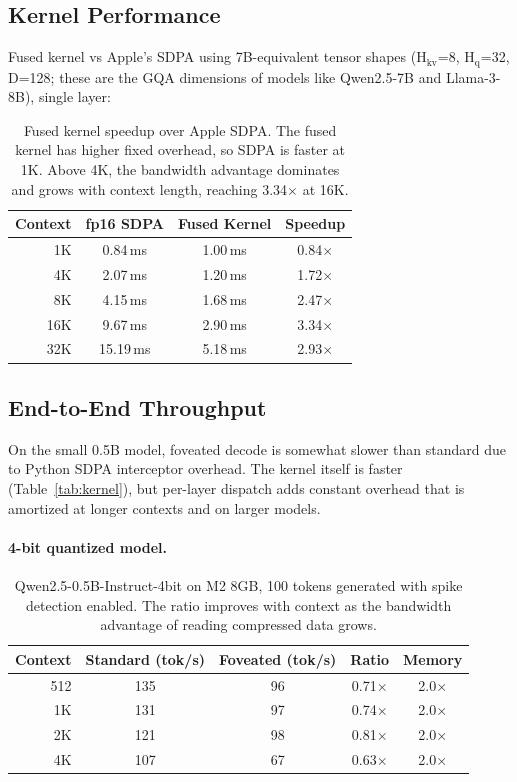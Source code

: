 \documentclass{article}
\begin{document}
\subsection{Kernel Performance}

Fused kernel vs Apple's SDPA using 7B-equivalent tensor shapes
(H$_\text{kv}$=8, H$_\text{q}$=32, D=128; these are the GQA
dimensions of models like Qwen2.5-7B and Llama-3-8B), single layer:

\begin{table}[h]
\centering
\begin{tabular}{rccc}
\toprule
Context & fp16 SDPA & Fused Kernel & Speedup \\
\midrule
1K & 0.84\,ms & 1.00\,ms & 0.84$\times$ \\
4K & 2.07\,ms & 1.20\,ms & 1.72$\times$ \\
8K & 4.15\,ms & 1.68\,ms & 2.47$\times$ \\
16K & 9.67\,ms & 2.90\,ms & 3.34$\times$ \\
32K & 15.19\,ms & 5.18\,ms & 2.93$\times$ \\
\bottomrule
\end{tabular}
\caption{Fused kernel speedup over Apple SDPA. The fused kernel has
higher fixed overhead, so SDPA is faster at 1K. Above 4K, the
bandwidth advantage dominates and grows with context length, reaching
3.34$\times$ at 16K.}
\end{table}

\subsection{End-to-End Throughput}

On the small 0.5B model, foveated decode is somewhat slower than standard
due to Python SDPA interceptor overhead. The kernel itself is faster
(Table~\ref{tab:kernel}), but per-layer dispatch adds constant overhead
that is amortized at longer contexts and on larger models.

\paragraph{4-bit quantized model.}

\begin{table}[h]
\centering
\begin{tabular}{rcccc}
\toprule
Context & Standard (tok/s) & Foveated (tok/s) & Ratio & Memory \\
\midrule
512 & 135 & 96 & 0.71$\times$ & 2.0$\times$ \\
1K & 131 & 97 & 0.74$\times$ & 2.0$\times$ \\
2K & 121 & 98 & 0.81$\times$ & 2.0$\times$ \\
4K & 107 & 67 & 0.63$\times$ & 2.0$\times$ \\
\bottomrule
\end{tabular}
\caption{Qwen2.5-0.5B-Instruct-4bit on M2 8GB, 100 tokens generated
with spike detection enabled. The ratio improves with context as the
bandwidth advantage of reading compressed data grows.}
\end{table}
\end{document}
